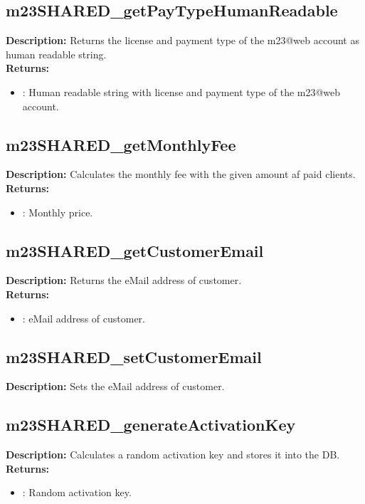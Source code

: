 \subsection{m23SHARED\_getPayTypeHumanReadable}
\textbf{Description:} Returns the license and payment type of the m23@web account as human readable string.\\
\textbf{Returns:}
\begin{itemize}
\item : Human readable string with license and payment type of the m23@web account.
\end{itemize}

\subsection{m23SHARED\_getMonthlyFee}
\textbf{Description:} Calculates the monthly fee with the given amount af paid clients.\\
\textbf{Returns:}
\begin{itemize}
\item : Monthly price.
\end{itemize}

\subsection{m23SHARED\_getCustomerEmail}
\textbf{Description:} Returns the eMail address of customer.\\
\textbf{Returns:}
\begin{itemize}
\item : eMail address of customer.
\end{itemize}

\subsection{m23SHARED\_setCustomerEmail}
\textbf{Description:} Sets the eMail address of customer.\\

\subsection{m23SHARED\_generateActivationKey}
\textbf{Description:} Calculates a random activation key and stores it into the DB.\\
\textbf{Returns:}
\begin{itemize}
\item : Random activation key.
\end{itemize}

